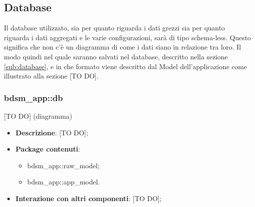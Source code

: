 %


\subsection{Database} %
\label{sec:database}
Il database utilizzato, sia per quanto riguarda i dati grezzi sia per quanto riguarda i dati aggregati e le varie configurazioni, sarà di tipo schema-less. Questo significa che non c'è un diagramma di come i dati siano in relazione tra loro. \newline
Il modo quindi nel quale saranno salvati nel database, descritto nella sezione \ref{sub:database}, e in che formato viene descritto dal Model dell'applicazione come illustrato alla sezione [TO DO]. \newline


  \subsubsection{bdsm\_app::db} %
  \label{ssub:bdsm_app_db}
  [TO DO] (diagramma) \newline \newline

  \begin{itemize}
    \item \textbf{Descrizione}: [TO DO];
    \item \textbf{Package contenuti}:
      \begin{itemize}
        \item bdsm\_app::raw\_model;
        \item bdsm\_app::app\_model.
      \end{itemize}
    \item \textbf{Interazione con altri componenti}: [TO DO];
  \end{itemize}


